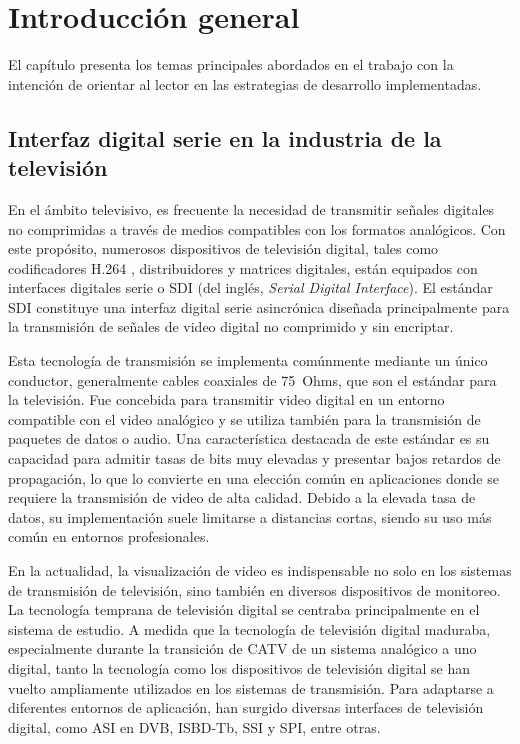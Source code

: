 \chapter{Introducción general}\label{Chapter1}

El capítulo presenta los temas principales abordados en el trabajo con la
intención de orientar al lector en las estrategias de desarrollo
implementadas.

\section{Interfaz digital serie en la industria de la televisión}

En el ámbito televisivo, es frecuente la necesidad de transmitir señales
digitales no comprimidas a través de medios compatibles con los formatos
analógicos. Con este propósito, numerosos dispositivos de televisión digital,
tales como codificadores H.264 \citep{h264}, distribuidores y matrices digitales, están
equipados con interfaces digitales serie o SDI (del inglés,
\textit{Serial Digital Interface}). El estándar SDI constituye una interfaz
digital serie asincrónica diseñada principalmente para la transmisión de señales
de video digital no comprimido y sin encriptar.

Esta tecnología de transmisión se implementa comúnmente mediante un único
conductor, generalmente cables coaxiales de 75~Ohms, que son el estándar para
la televisión. Fue concebida para transmitir video digital en un entorno
compatible con el video analógico y se utiliza también para la transmisión de
paquetes de datos o audio. Una característica destacada de este estándar es su
capacidad para admitir tasas de bits muy elevadas y presentar bajos retardos de
propagación, lo que lo convierte en una elección común en aplicaciones donde se
requiere la transmisión de video de alta calidad. Debido a la elevada tasa de
datos, su implementación suele limitarse a distancias cortas, siendo su uso más
común en entornos profesionales.

En la actualidad, la visualización de video es indispensable no solo en los
sistemas de transmisión de televisión, sino también en diversos dispositivos de
monitoreo. La tecnología temprana de televisión digital se centraba
principalmente en el sistema de estudio. A medida que la tecnología de
televisión digital maduraba, especialmente durante la transición de CATV de un
sistema analógico a uno digital, tanto la tecnología como los dispositivos de
televisión digital se han vuelto ampliamente utilizados en los sistemas de
transmisión. Para adaptarse a diferentes entornos de aplicación, han surgido
diversas interfaces de televisión digital, como ASI en DVB\citep{asi-dvb},
ISBD-Tb\citep{isbdt}, SSI\citep{ssi} y SPI\citep{spi},
entre otras.

